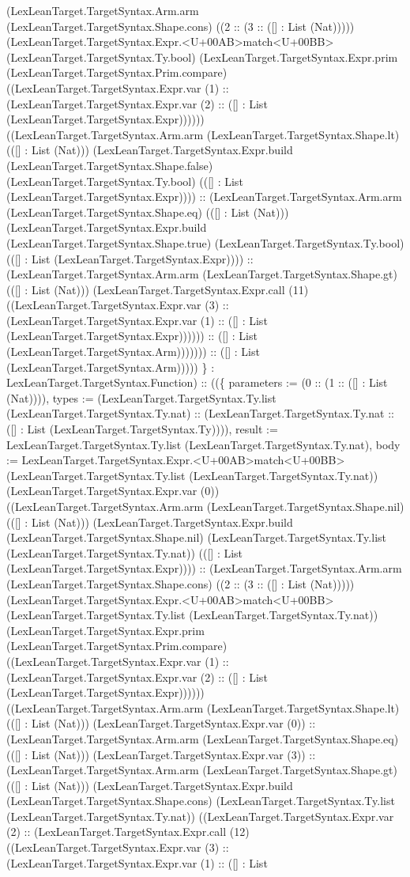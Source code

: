\documentclass[11pt]{article}
\begin{document}
(LexLeanTarget.TargetSyntax.Arm.arm (LexLeanTarget.TargetSyntax.Shape.cons) ((2 :: (3 :: ([] : List (Nat))))) (LexLeanTarget.TargetSyntax.Expr.<U+00AB>match<U+00BB> (LexLeanTarget.TargetSyntax.Ty.bool) (LexLeanTarget.TargetSyntax.Expr.prim (LexLeanTarget.TargetSyntax.Prim.compare) ((LexLeanTarget.TargetSyntax.Expr.var (1) :: (LexLeanTarget.TargetSyntax.Expr.var (2) :: ([] : List (LexLeanTarget.TargetSyntax.Expr)))))) ((LexLeanTarget.TargetSyntax.Arm.arm (LexLeanTarget.TargetSyntax.Shape.lt) (([] : List (Nat))) (LexLeanTarget.TargetSyntax.Expr.build (LexLeanTarget.TargetSyntax.Shape.false) (LexLeanTarget.TargetSyntax.Ty.bool) (([] : List (LexLeanTarget.TargetSyntax.Expr)))) :: (LexLeanTarget.TargetSyntax.Arm.arm (LexLeanTarget.TargetSyntax.Shape.eq) (([] : List (Nat))) (LexLeanTarget.TargetSyntax.Expr.build (LexLeanTarget.TargetSyntax.Shape.true) (LexLeanTarget.TargetSyntax.Ty.bool) (([] : List (LexLeanTarget.TargetSyntax.Expr)))) :: (LexLeanTarget.TargetSyntax.Arm.arm (LexLeanTarget.TargetSyntax.Shape.gt) (([] : List (Nat))) (LexLeanTarget.TargetSyntax.Expr.call (11) ((LexLeanTarget.TargetSyntax.Expr.var (3) :: (LexLeanTarget.TargetSyntax.Expr.var (1) :: ([] : List (LexLeanTarget.TargetSyntax.Expr)))))) :: ([] : List (LexLeanTarget.TargetSyntax.Arm))))))) :: ([] : List (LexLeanTarget.TargetSyntax.Arm))))) \} : LexLeanTarget.TargetSyntax.Function) :: ((\{ parameters := (0 :: (1 :: ([] : List (Nat)))), types := (LexLeanTarget.TargetSyntax.Ty.list (LexLeanTarget.TargetSyntax.Ty.nat) :: (LexLeanTarget.TargetSyntax.Ty.nat :: ([] : List (LexLeanTarget.TargetSyntax.Ty)))), result := LexLeanTarget.TargetSyntax.Ty.list (LexLeanTarget.TargetSyntax.Ty.nat), body := LexLeanTarget.TargetSyntax.Expr.<U+00AB>match<U+00BB> (LexLeanTarget.TargetSyntax.Ty.list (LexLeanTarget.TargetSyntax.Ty.nat)) (LexLeanTarget.TargetSyntax.Expr.var (0)) ((LexLeanTarget.TargetSyntax.Arm.arm (LexLeanTarget.TargetSyntax.Shape.nil) (([] : List (Nat))) (LexLeanTarget.TargetSyntax.Expr.build (LexLeanTarget.TargetSyntax.Shape.nil) (LexLeanTarget.TargetSyntax.Ty.list (LexLeanTarget.TargetSyntax.Ty.nat)) (([] : List (LexLeanTarget.TargetSyntax.Expr)))) :: (LexLeanTarget.TargetSyntax.Arm.arm (LexLeanTarget.TargetSyntax.Shape.cons) ((2 :: (3 :: ([] : List (Nat))))) (LexLeanTarget.TargetSyntax.Expr.<U+00AB>match<U+00BB> (LexLeanTarget.TargetSyntax.Ty.list (LexLeanTarget.TargetSyntax.Ty.nat)) (LexLeanTarget.TargetSyntax.Expr.prim (LexLeanTarget.TargetSyntax.Prim.compare) ((LexLeanTarget.TargetSyntax.Expr.var (1) :: (LexLeanTarget.TargetSyntax.Expr.var (2) :: ([] : List (LexLeanTarget.TargetSyntax.Expr)))))) ((LexLeanTarget.TargetSyntax.Arm.arm (LexLeanTarget.TargetSyntax.Shape.lt) (([] : List (Nat))) (LexLeanTarget.TargetSyntax.Expr.var (0)) :: (LexLeanTarget.TargetSyntax.Arm.arm (LexLeanTarget.TargetSyntax.Shape.eq) (([] : List (Nat))) (LexLeanTarget.TargetSyntax.Expr.var (3)) :: (LexLeanTarget.TargetSyntax.Arm.arm (LexLeanTarget.TargetSyntax.Shape.gt) (([] : List (Nat))) (LexLeanTarget.TargetSyntax.Expr.build (LexLeanTarget.TargetSyntax.Shape.cons) (LexLeanTarget.TargetSyntax.Ty.list (LexLeanTarget.TargetSyntax.Ty.nat)) ((LexLeanTarget.TargetSyntax.Expr.var (2) :: (LexLeanTarget.TargetSyntax.Expr.call (12) ((LexLeanTarget.TargetSyntax.Expr.var (3) :: (LexLeanTarget.TargetSyntax.Expr.var (1) :: ([] : List 
\end{document}

